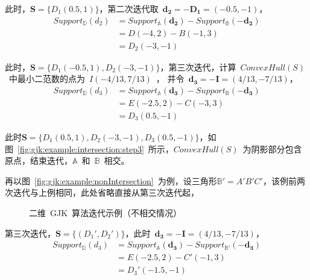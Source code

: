 此时，$\bm{S} = \{D_1(0.5, 1)\}$，第二次迭代取~$\bm{d_2}=-\bm{D_1}=(-0.5, -1)$，
\begin{equation}
  \begin{array}{ll}
  Support_\mathbb{D}(d_2)  & = Support_\mathbb{A}(\bm{d_2}) - Support_\mathbb{B}(-\bm{d_2}) \\
    & = D(-4, 2) - B(-1, 3) \\
    & = D_2(-3, -1)
  \end{array}
  \label{euqa:gjk:step2}
\end{equation}

此时，$\bm{S} = \{D_1(-0.5, 1), D_2(-3, -1)\}$，第三次迭代，计算~$ConvexHull(S)$~中最小二范数的点为~$I(-4/13, 7/13)$~，
并令~$\bm{d_3}=-\bm{I}=(4/13, -7/13)$，
\begin{equation}
  \begin{array}{ll}
  Support_\mathbb{D}(d_3)  & = Support_\mathbb{A}(\bm{d_3}) - Support_\mathbb{B}(-\bm{d_3}) \\
    & = E(-2.5, 2) - C(-3, 3) \\
    & = D_3(0.5, -1)
  \end{array}
  \label{euqa:gjk:step3}
\end{equation}

此时$\bm{S} = \{D_1(0.5, 1), D_2(-3, -1), D_3(0.5, -1)\}$，如图~\ref{fig:gjk:example:intersection:step3}~所示，$ConvexHull(S)$~为阴影部分包含原点，结束迭代，$\mathbb{A}$~和~$\mathbb{B}$~相交。

再以图~\ref{fig:gjk:example:nonIntersection}~为例，设三角形$\mathbb{B'} = A'B'C'$，该例前两次迭代与上例相同，此处省略直接从第三次迭代起，

\begin{figure}[htbp]
\centering
{} 
\caption{二维~GJK~算法迭代示例（不相交情况）}
\label{fig:gjk:example:2d:intersection:iterator}
\end{figure}

第三次迭代，$\bm{S} = \{(D_1', D_2') \}$，此时~$\bm{d_3}=-\bm{I}=(4/13, -7/13)$，
\begin{equation}
  \begin{array}{ll}
  Support_\mathbb{D}(d_3)  & = Support_\mathbb{A}(\bm{d_3}) - Support_\mathbb{B'}(-\bm{d_3}) \\
    & = E(-2.5, 2) - C'(-1, 3) \\
    & = D_3'(-1.5, -1)
  \end{array}
  \label{euqa:gjk:non:step3}
\end{equation}

